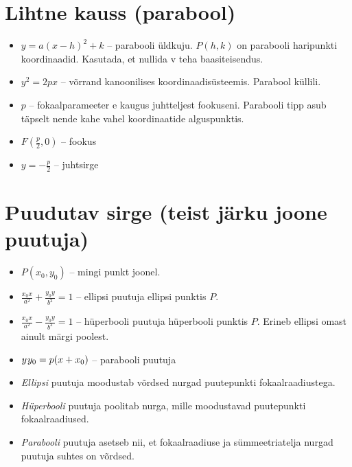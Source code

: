\documentclass{article}
\begin{document}
\begin{preview}
		\section*{Lihtne kauss (parabool)}
		\begin{itemize}
			\item $y = a(x-h)^2 + k$ – parabooli üldkuju. $P(h, k)$ on parabooli haripunkti koordinaadid. Kasutada, et nullida v teha baasiteisendus.
			\item $y^2 = 2px$ – võrrand kanoonilises koordinaadisüsteemis. Parabool küllili.
			\item $p$ – fokaalparameeter e kaugus juhtteljest fookuseni. Parabooli tipp asub täpselt nende kahe vahel koordinaatide alguspunktis.
			\item $F\left(\frac p2 , 0\right)$ – fookus
			\item $y = -\frac p2$ – juhtsirge
			
		\end{itemize}
		
		\section*{Puudutav sirge (teist järku joone puutuja)}
		\begin{itemize}
			\item $P(x_0, y_0)$ – mingi punkt joonel.
			\item $\frac{x_0 x}{a^2} + \frac{y_0 y}{b^2} = 1$ – ellipsi puutuja ellipsi punktis $P$.
			\item $\frac{x_0 x}{a^2} - \frac{y_0 y}{b^2} = 1$ – hüperbooli puutuja hüperbooli punktis $P$. Erineb ellipsi omast ainult märgi poolest.
			\item $y\kern 0.07em y_0 = p(x+x_0)$ – parabooli puutuja
			\item \emph{Ellipsi} puutuja moodustab võrdsed nurgad puutepunkti fokaalraadiustega.
			\item \emph{Hüperbooli} puutuja poolitab nurga, mille moodustavad puutepunkti fokaalraadiused.
			\item \emph{Parabooli} puutuja asetseb nii, et fokaalraadiuse ja sümmeetriatelja nurgad puutuja suhtes on võrdsed.
		
		\end{itemize}
		
	\end{preview}
\end{document}
